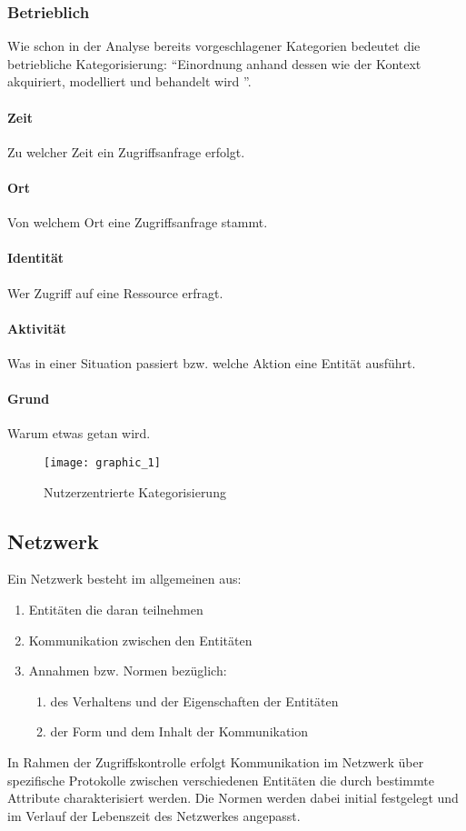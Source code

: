 \subsubsection{Betrieblich}
Wie schon in der Analyse bereits vorgeschlagener Kategorien bedeutet die betriebliche Kategorisierung: ``Einordnung anhand dessen wie der Kontext akquiriert, modelliert und behandelt wird ''.
\paragraph{Zeit}
Zu welcher Zeit ein Zugriffsanfrage erfolgt.
\paragraph{Ort}
Von welchem Ort eine Zugriffsanfrage stammt.
\paragraph{Identität}
Wer Zugriff auf eine Ressource erfragt.
\paragraph{Aktivität}
Was in einer Situation passiert bzw. welche Aktion eine Entität ausführt.
\paragraph{Grund}
Warum etwas getan wird.
\begin{figure}[H]
\centering
\texttt{[image: graphic\_1]}
\caption{Nutzerzentrierte Kategorisierung}
\end{figure}

\subsection{Netzwerk}
Ein Netzwerk besteht im allgemeinen aus:
\begin{enumerate}
\item{Entitäten die daran teilnehmen}
\item{Kommunikation zwischen den Entitäten}
\item{Annahmen bzw. Normen bezüglich:}
\begin{enumerate}
	\item{des Verhaltens und der Eigenschaften der Entitäten}
	\item{der Form und dem Inhalt der Kommunikation}
\end{enumerate}
\end{enumerate}
In Rahmen der Zugriffskontrolle erfolgt Kommunikation im Netzwerk über spezifische Protokolle zwischen verschiedenen Entitäten die durch bestimmte Attribute charakterisiert werden. Die Normen werden dabei initial festgelegt und im Verlauf der Lebenszeit des Netzwerkes angepasst.  
